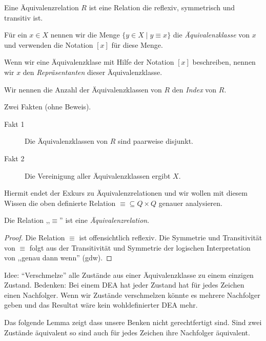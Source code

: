 \begin{Def}
Eine Äquivalenzrelation $R$ ist eine Relation die reflexiv, symmetrisch und transitiv ist.

Für ein $x\in X$ nennen wir die Menge $\{y\in X \mid y \equiv x\}$ die \emph{Äquivalenzklasse} von $x$
und verwenden die Notation $[x]$ für diese Menge.

Wenn wir eine Äquivalenzklase mit Hilfe der Notation $[x]$ beschreiben, nennen wir $x$ den \emph{Repräsentanten} dieser Äquivalenzklasse.

Wir nennen die Anzahl der Äquivalenzklassen von $R$ den \emph{Index} von $R$.
\end{Def}

Zwei Fakten (ohne Beweis).
\begin{description}
 \item[Fakt 1] Die Äquivalenzklassen von $R$ sind paarweise disjunkt.
 \item[Fakt 2] Die Vereinigung aller Äquivalenzklassen ergibt $X$.
\end{description}

Hiermit endet der Exkurs zu Äquivalenzrelationen und wir wollen mit diesem Wissen die oben definierte Relation $\equiv\subseteq Q\times Q$ genauer analysieren.

\begin{lemma}[name={[$\equiv$ ist Äquivalenzrelation]}] %
        Die Relation ,,$\equiv$'' ist eine \emph{Äquivalenzrelation}.
\end{lemma}
\begin{proof}

  Die Relation $\equiv$ ist offensichtlich reflexiv.
  Die Symmetrie und Transitivität von $\equiv$ folgt aus der Transitivität und Symmetrie der logischen Interpretation von ,,genau dann wenn'' (gdw).
\end{proof}







Idee: ``Verschmelze'' alle Zustände aus einer Äquivalenzklasse zu einem einzigen Zustand.
Bedenken: Bei einem \ac{DEA} hat jeder Zustand hat für jedes Zeichen einen Nachfolger. 
Wenn wir Zustände verschmelzen könnte es mehrere Nachfolger geben und das Resultat wäre kein wohldefinierter \ac{DEA} mehr.

Das folgende Lemma zeigt dass unsere Benken nicht gerechtfertigt sind. 
Sind zwei Zustände äquivalent so sind auch für jedes Zeichen ihre Nachfolger äquivalent.

